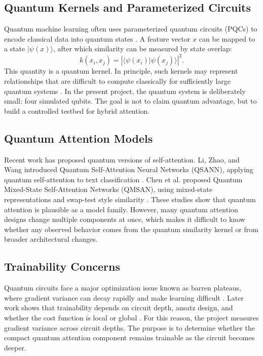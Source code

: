 \documentclass[11pt]{article}
\begin{document}
\subsection{Quantum Kernels and Parameterized Circuits}
Quantum machine learning often uses parameterized quantum circuits (PQCs) to encode classical data into quantum states \cite{schuld2019quantum}. A feature vector \(x\) can be mapped to a state \(\lvert \psi(x) \rangle\), after which similarity can be measured by state overlap:
\[
k(x_i,x_j)=\left|\langle \psi(x_i)\vert \psi(x_j)\rangle\right|^2.
\]
This quantity is a quantum kernel. In principle, such kernels may represent relationships that are difficult to compute classically for sufficiently large quantum systems \cite{havlicek2019supervised}. In the present project, the quantum system is deliberately small: four simulated qubits. The goal is not to claim quantum advantage, but to build a controlled testbed for hybrid attention.

\subsection{Quantum Attention Models}
Recent work has proposed quantum versions of self-attention. Li, Zhao, and Wang introduced Quantum Self-Attention Neural Networks (QSANN), applying quantum self-attention to text classification \cite{li2023qsann}. Chen et al. proposed Quantum Mixed-State Self-Attention Networks (QMSAN), using mixed-state representations and swap-test style similarity \cite{chen2025qmsan}. These studies show that quantum attention is plausible as a model family. However, many quantum attention designs change multiple components at once, which makes it difficult to know whether any observed behavior comes from the quantum similarity kernel or from broader architectural changes.

\subsection{Trainability Concerns}
Quantum circuits face a major optimization issue known as barren plateaus, where gradient variance can decay rapidly and make learning difficult \cite{mcclean2018barren}. Later work shows that trainability depends on circuit depth, ansatz design, and whether the cost function is local or global \cite{cerezo2021cost,holmes2022connecting}. For this reason, the project measures gradient variance across circuit depths. The purpose is to determine whether the compact quantum attention component remains trainable as the circuit becomes deeper.
\end{document}
